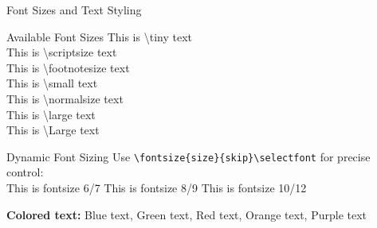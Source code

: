 \begin{frame}{Font Sizes and Text Styling}
  \begin{block}{Available Font Sizes}
    \tiny This is \textbackslash tiny text \\
    \scriptsize This is \textbackslash scriptsize text \\
    \footnotesize This is \textbackslash footnotesize text \\
    \small This is \textbackslash small text \\
    \normalsize This is \textbackslash normalsize text \\
    \large This is \textbackslash large text \\
    \Large This is \textbackslash Large text
  \end{block}

  \vspace{0.2cm}

  \begin{exampleblock}{Dynamic Font Sizing}
    \scriptsize
    Use \texttt{\textbackslash fontsize\{size\}\{skip\}\textbackslash selectfont} for precise control: \\
    {\fontsize{6}{7}\selectfont This is fontsize 6/7} \quad
    {\fontsize{8}{9}\selectfont This is fontsize 8/9} \quad
    {\fontsize{10}{12}\selectfont This is fontsize 10/12}
  \end{exampleblock}

  \vspace{0.2cm}

  \scriptsize
  \textbf{Colored text:}
  \textcolor{accentblue}{Blue text},
  \textcolor{accentgreen}{Green text},
  \textcolor{accentred}{Red text},
  \textcolor{accentorange}{Orange text},
  \textcolor{accentpurple}{Purple text}
\end{frame}
